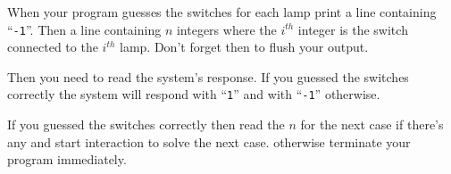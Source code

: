 When your program guesses the switches for each lamp print a line containing ``\texttt{-1}''. Then a line containing $n$ integers where the $i^{th}$ integer is the switch connected to the $i^{th}$ lamp. Don't forget then to flush your output.

Then you need to read the system's response. If you guessed the switches correctly the system will respond with ``\texttt{1}'' and with ``\texttt{-1}'' otherwise.

If you guessed the switches correctly then read the $n$ for the next case if there's any and start interaction to solve the next case. otherwise terminate your program immediately.
